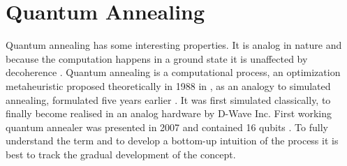 \section{Quantum Annealing}
Quantum annealing has some interesting properties. It is analog in nature and because the computation happens in a ground state it is unaffected by decoherence \cite{mcgeoch_adiabatic_2014}.
Quantum annealing is a computational process, an optimization metaheuristic proposed theoretically in 1988 in \cite{apolloni_numerical_1988}, as an analogy to simulated annealing, formulated five years earlier \cite{kirkpatrick_optimization_1983}. It was first simulated classically, to finally become realised in an analog hardware by D-Wave Inc. First working quantum annealer was presented in 2007 and contained 16 qubits \cite{d-wave_inc_d-wave_2007}. To fully understand the term and to develop a bottom-up intuition of the process it is best to track the gradual development of the concept.


